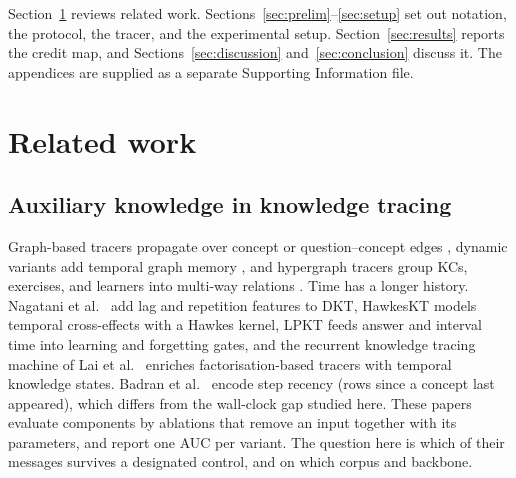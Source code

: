 \documentclass[review,12pt]{elsarticle}
\begin{document}
Section~\ref{sec:related} reviews related work.
Sections~\ref{sec:prelim}--\ref{sec:setup} set out notation, the
protocol, the tracer, and the experimental setup.
Section~\ref{sec:results} reports the credit map, and
Sections~\ref{sec:discussion} and~\ref{sec:conclusion} discuss it.
The appendices are supplied as a separate Supporting Information file.

\section{Related work}
\label{sec:related}

\subsection{Auxiliary knowledge in knowledge tracing}
Graph-based tracers propagate over concept or question--concept edges
\cite{nakagawa2019gkt,tong2020skt,yang2021gikt}, dynamic variants add temporal
graph memory \cite{dygkt2024,dgekt2024}, and hypergraph tracers group
KCs, exercises, and learners into multi-way relations
\cite{thmn2025,hgkt2025,htkt2025,psykt2024,hhskt2023}. Time has a
longer history. Nagatani et al.~\cite{nagatani2019forget} add lag and
repetition features to DKT, HawkesKT \cite{wang2021hawkeskt} models
temporal cross-effects with a Hawkes kernel, LPKT \cite{shen2021lpkt}
feeds answer and interval time into learning and forgetting gates, and
the recurrent knowledge tracing machine of Lai et
al.~\cite{lai2021rktm} enriches factorisation-based tracers with
temporal knowledge states. Badran et al.~\cite{badran2025leakage}
encode step recency (rows since a concept last appeared), which differs
from the wall-clock gap studied here. These papers evaluate components
by ablations that remove an input together with its parameters, and
report one AUC per variant. The question
here is which of their messages survives a designated control, and on
which corpus and backbone.
\end{document}
